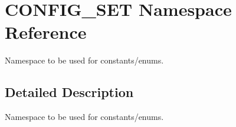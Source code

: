 \hypertarget{namespaceCONFIG__SET}{}\section{C\+O\+N\+F\+I\+G\+\_\+\+S\+ET Namespace Reference}
\label{namespaceCONFIG__SET}


Namespace to be used for constants/enums.  




\subsection{Detailed Description}
Namespace to be used for constants/enums. 